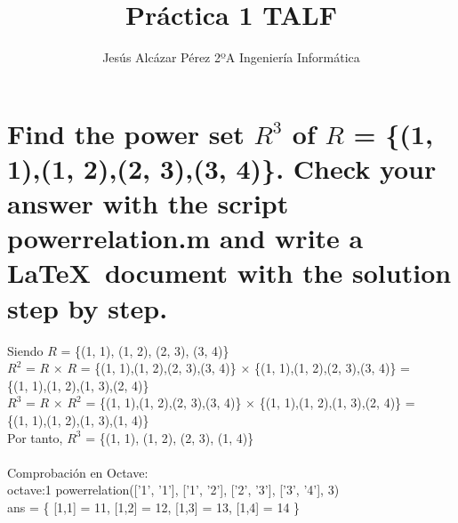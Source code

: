 \documentclass[11pt]{article}
\title{\textbf{Práctica 1 TALF}}
\author{Jesús Alcázar Pérez 2ºA Ingeniería Informática}
\date{}
\begin{document}
\maketitle
\thispagestyle{empty}

\section{Find the power set $R^3$ of $R$ = \{(1, 1),(1, 2),(2, 3),(3, 4)\}. Check your answer with the script powerrelation.m and write a \LaTeX\ document with the solution step by step.}

Siendo $R$ = \{(1, 1), (1, 2), (2, 3), (3, 4)\} \\
$R^2$ = $R$ × $R$ = \{(1, 1),(1, 2),(2, 3),(3, 4)\} × \{(1, 1),(1, 2),(2, 3),(3, 4)\} = \\
\{(1, 1),(1, 2),(1, 3),(2, 4)\} \\
$R^3$ = $R$ × $R^2$ = \{(1, 1),(1, 2),(2, 3),(3, 4)\} × \{(1, 1),(1, 2),(1, 3),(2, 4)\} = \\
\{(1, 1),(1, 2),(1, 3),(1, 4)\} \\
Por tanto, $R^3$ = \{(1, 1), (1, 2), (2, 3), (1, 4)\}
\\
\\
Comprobación en Octave: \\
octave:1 powerrelation({['1', '1'], ['1', '2'], ['2', '3'], ['3', '4']}, 3)\\
ans = \{ [1,1] = 11, [1,2] = 12, [1,3] = 13, [1,4] = 14 \}
\end{document}
